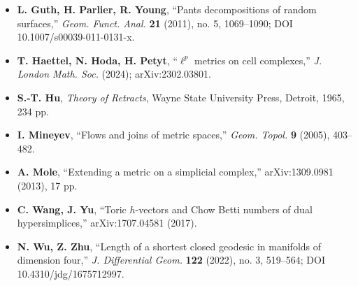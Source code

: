 \documentclass[
]{article}
\begin{document}
\begin{itemize}
  385--391; DOI 10.1112/blms/14.5.385.
\item
  \textbf{L. Guth, H. Parlier, R. Young}, ``Pants decompositions of
  random surfaces,'' \emph{Geom. Funct. Anal.} \textbf{21} (2011), no.
  5, 1069--1090; DOI 10.1007/s00039-011-0131-x.
\item
  \textbf{T. Haettel, N. Hoda, H. Petyt}, ``\(\ell^p\) metrics on cell
  complexes,'' \emph{J. London Math. Soc.} (2024); arXiv:2302.03801.
\item
  \textbf{S.-T. Hu}, \emph{Theory of Retracts}, Wayne State University
  Press, Detroit, 1965, 234 pp.
\item
  \textbf{I. Mineyev}, ``Flows and joins of metric spaces,'' \emph{Geom.
  Topol.} \textbf{9} (2005), 403--482.
\item
  \textbf{A. Mole}, ``Extending a metric on a simplicial complex,''
  arXiv:1309.0981 (2013), 17 pp.
\item
  \textbf{C. Wang, J. Yu}, ``Toric \(h\)-vectors and Chow Betti numbers
  of dual hypersimplices,'' arXiv:1707.04581 (2017).
\item
  \textbf{N. Wu, Z. Zhu}, ``Length of a shortest closed geodesic in
  manifolds of dimension four,'' \emph{J. Differential Geom.}
  \textbf{122} (2022), no. 3, 519--564; DOI 10.4310/jdg/1675712997.
\end{itemize}
\end{document}
